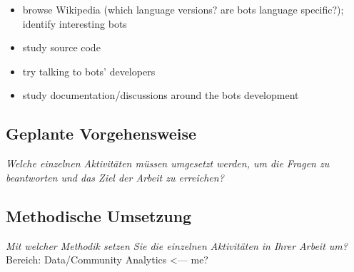 \documentclass[pdftex,a4paper,11pt]{scrartcl}
\begin{document}
\begin{itemize}
  \item browse Wikipedia (which language versions? are bots language specific?); identify interesting bots
  \item study source code
  \item try talking to bots' developers
  \item study documentation/discussions around the bots development
\end{itemize}

\subsection{Geplante Vorgehensweise}
\noindent \emph{Welche einzelnen Aktivitäten müssen umgesetzt werden, um die Fragen zu beantworten und das Ziel der Arbeit zu erreichen?}
\begin{comment}
\begin{itemize}
	\item Aus den Fragen (vorheriger Abschnitt) können Sie dann Aktivitäten ableiten, die Ihnen helfen, Ihre weitere Arbeit zu strukturieren.
\end{itemize}
\end{comment}

\subsection{Methodische Umsetzung}
\noindent \emph{Mit welcher Methodik setzen Sie die einzelnen Aktivitäten in Ihrer Arbeit um?}
Bereich: Data/Community Analytics <--- me?
\end{document}
